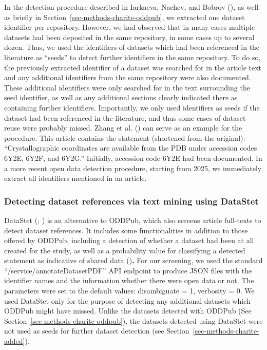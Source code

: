 \documentclass[
  letterpaper,
  DIV=11,
  numbers=noendperiod]{scrartcl}
\begin{document}
In the detection procedure described in Iarkaeva, Nachev, and Bobrov
(), as well
as briefly in Section~\ref{sec-methods-charite-oddpub}, we extracted one
dataset identifier per repository. However, we had observed that in many
cases multiple datasets had been deposited in the same repository, in
some cases up to several dozen. Thus, we used the identifiers of
datasets which had been referenced in the literature as ``seeds'' to
detect further identifiers in the same repository. To do so, the
previously extracted identifier of a dataset was searched for in the
article text and any additional identifiers from the same repository
were also documented. These additional identifiers were only searched
for in the text surrounding the seed identifier, as well as any
additional sections clearly indicated there as containing further
identifiers. Importantly, we only used identifiers as seeds if the
dataset had been referenced in the literature, and thus some cases of
dataset reuse were probably missed. Zhang et al.
() can serve as an
example for the procedure. This article contains the statement
(shortened from the original): ``Crystallographic coordinates are
available from the PDB under accession codes 6Y2E, 6Y2F, and 6Y2G.''
Initially, accession code 6Y2E had been documented. In a more recent
open data detection procedure, starting from 2025, we immediately
extract all identifiers mentioned in an article.

\subsubsection{Detecting dataset references via text mining using
DataStet}\label{sec-methods-charite-datastet}

DataStet (;
) is an alternative to ODDPub, which also screens article
full-texts to detect dataset references. It includes some
functionalities in addition to those offered by ODDPub, including a
detection of whether a dataset had been at all created for the study, as
well as a probability value for classifying a detected statement as
indicative of shared data
()\textbf{.} For our screening, we used the standard
``/service/annotateDatasetPDF'' API endpoint to produce JSON files with
the identifier names and the information whether there were open data or
not. The parameters were set to the default values: disambiguate = 1,
verbosity = 0. We used DataStet only for the purpose of detecting any
additional datasets which ODDPub might have missed. Unlike the datasets
detected with ODDPub (See Section~\ref{sec-methods-charite-oddpub}), the
datasets detected using DataStet were not used as seeds for further
dataset detection (see Section~\ref{sec-methods-charite-added}).
\end{document}
